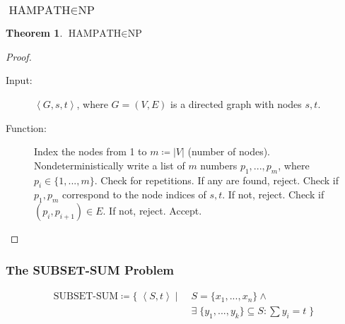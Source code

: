 \documentclass[notheorems]{beamer}
\theoremstyle{definition}
\newtheorem{theorem}{Theorem}
\theoremstyle{remark}
\newcommand{\npclass}{\text{NP}}
\newcommand{\hampathprob}{\text{HAMPATH}}
\newcommand{\subsetsumprob}{\text{SUBSET-SUM}}
\newcommand{\lpp}{\left \langle}
\newcommand{\rpp}{\right \rangle}
\newcommand{\enc}[1]{\lpp #1 \rpp}
\begin{document}
\begin{frame}
    \frametitle{\(\hampathprob \in \npclass\)}
    \begin{theorem}
        \(\hampathprob \in \npclass\)
    \end{theorem}

    \pause

    \begin{proof}
        \footnotesize
        \begin{description}
            \item[Input:] \(\enc{G, s, t}\), where \(G = (V, E)\) is a directed graph with nodes \(s, t\).
            \item[Function:] \phantom{}
                  \begin{algorithmic}[1]
                      \State Index the nodes from 1 to \(m \coloneqq |V|\) (number of nodes). Nondeterministically write a list of \(m\) numbers \(p_1, ..., p_m\), where \(p_i \in \{1, ..., m\}\).
                      \State Check for repetitions. If any are found, reject.
                      \State Check if \(p_1, p_m\) correspond to the node indices of \(s, t\). If not, reject.
                      \State Check if \((p_i, p_{i+1}) \in E\). If not, reject.
                      \EndFor
                      \State Accept.
                  \end{algorithmic}
        \end{description}
    \end{proof}

\end{frame}

\begin{frame}
    \frametitle{The SUBSET-SUM Problem}

    \begin{align*}
        \subsetsumprob \coloneqq \{\; \enc{S, t} \mid \; & S = \{x_1, ..., x_n\} \land \\&\exists \; \{y_1,...,y_k\} \subseteq S\colon \textstyle\sum y_i = t  \;\}
    \end{align*}

\end{frame}
\end{document}
